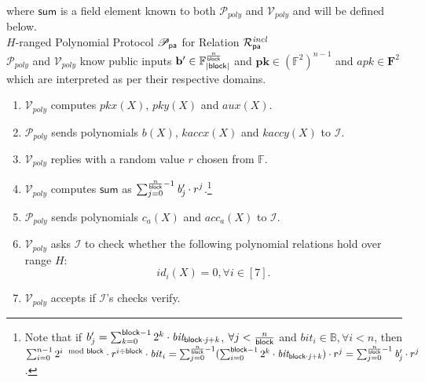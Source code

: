\noindent where $\mathsf{sum}$ is a field element known to both $\mathcal{P}_{poly}$ and $\mathcal{V}_{poly}$ and will be defined below. \\ 

\noindent \textsf{$H$-ranged Polynomial Protocol $\mathscr{P}_{\mathsf{pa}}$ for Relation $\mathcal{R}^{\mathit{incl}}_{\mathsf{pa}}$} \\



\noindent $\mathcal{P}_{poly}$ and $\mathcal{V}_{poly}$ know public inputs 
$\mathbf{b'} \in \mathbb{F}_{|\mathsf{block}|}^{\frac{n}{\mathsf{block}}}$ and 
$\mathbf{pk} \in (\mathbb{F}^2)^{n-1} $ and $\mathit{apk} \in \mathbf{F}^2$ which are interpreted as per their respective domains. \\

\begin{enumerate}
\item $\mathcal{V}_{poly}$ computes $pkx(X)$, $pky(X)$ and $aux(X)$.
\item $\mathcal{P}_{poly}$ sends polynomials $b(X)$, $kaccx(X)$ and $kaccy(X)$ to $\mathcal{I}$. 
\item $\mathcal{V}_{poly}$ replies with a random value $r$ chosen from $\mathbb{F}$. 
\item $\mathcal{V}_{poly}$ computes $\mathsf{sum}$ as $\sum_{j=0}^{\frac{n}{\mathsf{block}}-1} \mathit{b'_{j}} \cdot r^j$.\footnote{Note that if 
$b'_{j} = \sum_{k=0}^{\mathsf{block} -1}2^k \cdot \mathit{bit_{\mathsf{block} \cdot j + k }}$, $\forall j < \frac{n}{\mathsf{block}}$ and $\mathit{bit_i} \in \mathbb{B}, \forall i <n$, 
then $\sum_{i=0}^{n-1} 2^{i \mod {\mathsf{block}}} \cdot r^{i \div \mathsf{block}} \cdot \mathit{bit}_{i} = \sum_{j=0}^{\frac{n}{\mathsf{block}}-1}(\sum_{i=0}^{\mathsf{block} -1}2^k \cdot \mathit{bit_{\mathsf{block} \cdot j + k }}) \cdot r^j= \sum_{j=0}^{\frac{n}{\mathsf{block}}-1} \mathit{b'_{j}} \cdot r^j$.}
\item $\mathcal{P}_{poly}$ sends polynomials $c_{a}(X)$ and $acc_{a}(X)$ to $\mathcal{I}$. 
\item $\mathcal{V}_{poly}$ asks $\mathcal{I}$ to check whether the following polynomial relations hold over range $H$: 
$$id_i(X) = 0, \forall i \in [7].$$
\item $\mathcal{V}_{poly}$ accepts if $\mathcal{I}$'s checks verify. 
\end{enumerate}

